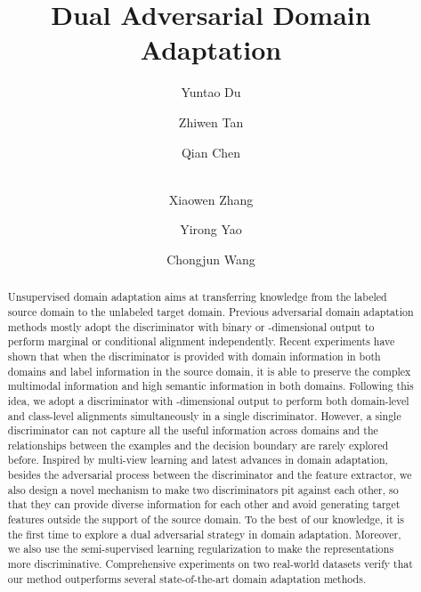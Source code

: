 \documentclass{ecai}
\begin{document}
\title{Dual Adversarial Domain Adaptation}

\author{
Yuntao Du  \and
Zhiwen Tan   \and
Qian Chen   \and \\
Xiaowen Zhang   \and
Yirong Yao   \and
Chongjun Wang
}

\maketitle


\begin{abstract}
Unsupervised domain adaptation aims at transferring knowledge from the labeled source domain to the unlabeled target domain. Previous adversarial domain adaptation methods mostly adopt the discriminator with binary or -dimensional output  to perform marginal or conditional alignment independently. Recent experiments have shown that when the discriminator is provided with domain information in both domains and label information in the source domain, it is able to preserve the complex multimodal information and high semantic information in both domains. Following this idea, we adopt a discriminator with -dimensional output to perform both domain-level and class-level alignments simultaneously in a single discriminator. However, a single discriminator can not capture all the useful information across domains and the relationships between the examples and the decision boundary are rarely explored before. Inspired by multi-view learning and latest advances in domain adaptation, besides the adversarial process between the discriminator and the feature extractor, we also design a novel mechanism to make two discriminators pit against each other, so that they can provide diverse information for each other and avoid generating target features outside the support of the source domain.  To the best of our knowledge, it is the first time to explore a dual adversarial strategy in domain adaptation. Moreover, we also use the semi-supervised learning regularization to make the representations more discriminative. Comprehensive experiments on two real-world datasets verify that our method outperforms several state-of-the-art domain adaptation methods.
\end{abstract}
\end{document}
